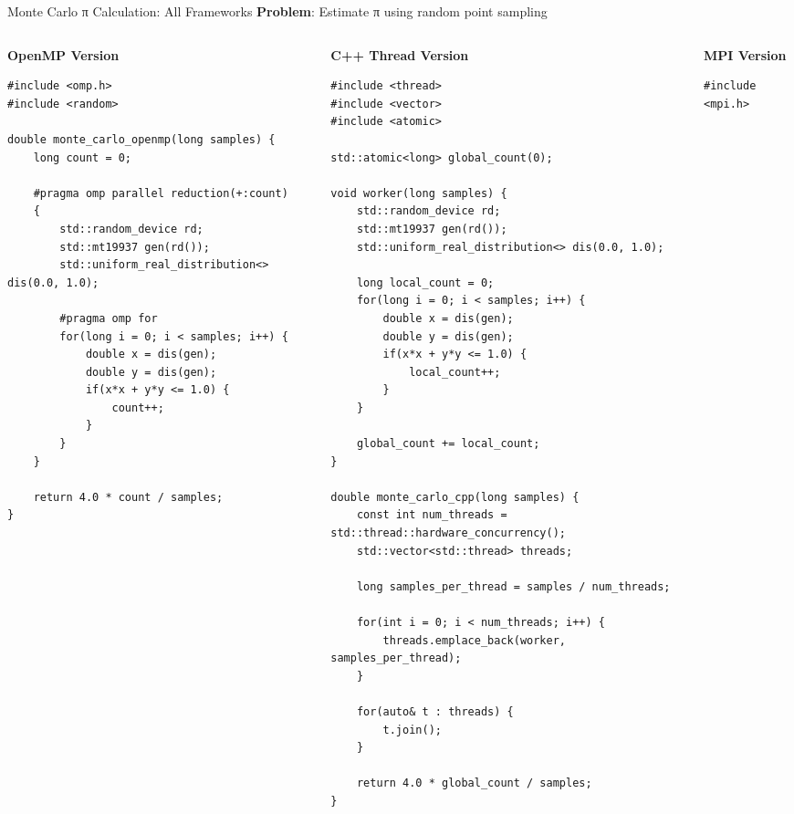 \begin{frame}[fragile]{ Monte Carlo π Calculation: All Frameworks}
	\textbf{Problem}: Estimate π using random point sampling

	\begin{columns}
		\begin{column}{0.3\textwidth}
			\textbf{OpenMP Version}
			\begin{verbatim}
#include <omp.h>
#include <random>

double monte_carlo_openmp(long samples) {
    long count = 0;

    #pragma omp parallel reduction(+:count)
    {
        std::random_device rd;
        std::mt19937 gen(rd());
        std::uniform_real_distribution<> dis(0.0, 1.0);

        #pragma omp for
        for(long i = 0; i < samples; i++) {
            double x = dis(gen);
            double y = dis(gen);
            if(x*x + y*y <= 1.0) {
                count++;
            }
        }
    }

    return 4.0 * count / samples;
}
			\end{verbatim}
		\end{column}
		\begin{column}{0.35\textwidth}
			\textbf{C++ Thread Version}
			\begin{verbatim}
#include <thread>
#include <vector>
#include <atomic>

std::atomic<long> global_count(0);

void worker(long samples) {
    std::random_device rd;
    std::mt19937 gen(rd());
    std::uniform_real_distribution<> dis(0.0, 1.0);

    long local_count = 0;
    for(long i = 0; i < samples; i++) {
        double x = dis(gen);
        double y = dis(gen);
        if(x*x + y*y <= 1.0) {
            local_count++;
        }
    }

    global_count += local_count;
}

double monte_carlo_cpp(long samples) {
    const int num_threads = std::thread::hardware_concurrency();
    std::vector<std::thread> threads;

    long samples_per_thread = samples / num_threads;

    for(int i = 0; i < num_threads; i++) {
        threads.emplace_back(worker, samples_per_thread);
    }

    for(auto& t : threads) {
        t.join();
    }

    return 4.0 * global_count / samples;
}
			\end{verbatim}
		\end{column}
		\begin{column}{0.35\textwidth}
			\textbf{MPI Version}
			\begin{verbatim}
#include <mpi.h>


\end{verbatim}
\end{column}
\end{columns}
\end{frame}
